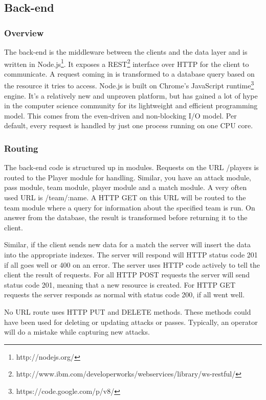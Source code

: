 \subsection{Back-end}

\subsubsection{Overview}	
The back-end is the middleware between the clients and the data layer and is written in Node.js\footnote{http://nodejs.org/}. It exposes a \ac{REST}\footnote{http://www.ibm.com/developerworks/webservices/library/ws-restful/} interface over \ac{HTTP} for the client to communicate. A request coming in is transformed to a database query based on the resource it tries to access. Node.js is built on Chrome’s JavaScript runtime\footnote{https://code.google.com/p/v8/} engine. It’s a relatively new and unproven platform, but has gained a lot of hype in the computer science community for its lightweight and efficient programming model. This comes from the even-driven and non-blocking I/O model. Per default, every request is handled by just one process running on one CPU core.

\subsubsection{Routing}	

The back-end code is structured up in modules. Requests on the URL /players is routed to the Player module for handling. Similar, you have an attack module, pass module, team module, player module and a match module. A very often used URL is /team/:name. A \ac{HTTP} GET on this URL will be routed to the team module where a query for information about the specified team is run. On answer from the database, the result is transformed before returning it to the client. 

Similar, if the client sends new data for a match the server will insert the data into the appropriate indexes. The server will respond will HTTP status code 201 if all goes well or 400 on an error. The server uses \ac{HTTP} code actively to tell the client the result of requests. For all \ac{HTTP} POST requests the server will send status code 201, meaning that a new resource is created. For \ac{HTTP} GET requests the server responds as normal with status code 200, if all went well. 

No URL route uses \ac{HTTP} PUT and DELETE methods. These methods could have been used for deleting or updating attacks or passes. Typically, an operator will do a mistake while capturing new attacks. 

